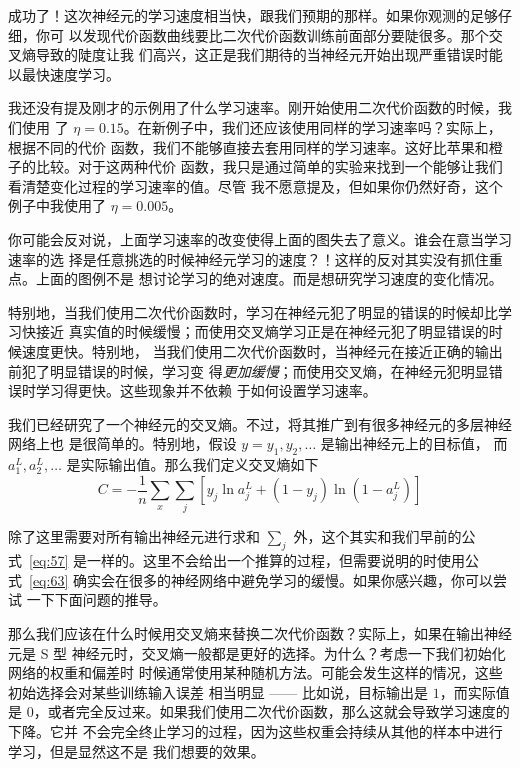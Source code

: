 成功了！这次神经元的学习速度相当快，跟我们预期的那样。如果你观测的足够仔细，你可
以发现代价函数曲线要比二次代价函数训练前面部分要陡很多。那个交叉熵导致的陡度让我
们高兴，这正是我们期待的当神经元开始出现严重错误时能以最快速度学习。

我还没有提及刚才的示例用了什么学习速率。刚开始使用二次代价函数的时候，我们使用
了
$\eta = 0.15$。在新例子中，我们还应该使用同样的学习速率吗？实际上，根据不同的代价
函数，我们不能够直接去套用同样的学习速率。这好比苹果和橙子的比较。对于这两种代价
函数，我只是通过简单的实验来找到一个能够让我们看清楚变化过程的学习速率的值。尽管
我不愿意提及，但如果你仍然好奇，这个例子中我使用了 $\eta = 0.005$。

你可能会反对说，上面学习速率的改变使得上面的图失去了意义。谁会在意当学习速率的选
择是任意挑选的时候神经元学习的速度？！这样的反对其实没有抓住重点。上面的图例不是
想讨论学习的绝对速度。而是想研究学习速度的变化情况。

特别地，当我们使用二次代价函数时，学习在神经元犯了明显的错误的时候却比学习快接近
真实值的时候缓慢；而使用交叉熵学习正是在神经元犯了明显错误的时候速度更快。特别地，
当我们使用二次代价函数时，当神经元在接近正确的输出前犯了明显错误的时候，学习变
得\emph{更加缓慢}；而使用交叉熵，在神经元犯明显错误时学习得更快。这些现象并不依赖
于如何设置学习速率。

我们已经研究了一个神经元的交叉熵。不过，将其推广到有很多神经元的多层神经网络上也
是很简单的。特别地，假设 $y = y_1, y_2, \ldots$ 是输出神经元上的目标值，
而 $a^L_1, a^L_2, \ldots$ 是实际输出值。那么我们定义交叉熵如下
\begin{equation}
  C = -\frac{1}{n} \sum_x \sum_j \left[y_j \ln a^L_j + (1-y_j) \ln (1-a^L_j) \right]
  \label{eq:63}\tag{63}
\end{equation}

除了这里需要对所有输出神经元进行求和 $\sum_j$ 外，这个其实和我们早前的公
式~\eqref{eq:57} 是一样的。这里不会给出一个推算的过程，但需要说明的时使用公
式~\eqref{eq:63} 确实会在很多的神经网络中避免学习的缓慢。如果你感兴趣，你可以尝试
一下下面问题的推导。

那么我们应该在什么时候用交叉熵来替换二次代价函数？实际上，如果在输出神经元是 S 型
神经元时，交叉熵一般都是更好的选择。为什么？考虑一下我们初始化网络的权重和偏差时
时候通常使用某种随机方法。可能会发生这样的情况，这些初始选择会对某些训练输入误差
相当明显 —— 比如说，目标输出是 $1$，而实际值是
$0$，或者完全反过来。如果我们使用二次代价函数，那么这就会导致学习速度的下降。它并
不会完全终止学习的过程，因为这些权重会持续从其他的样本中进行学习，但是显然这不是
我们想要的效果。

